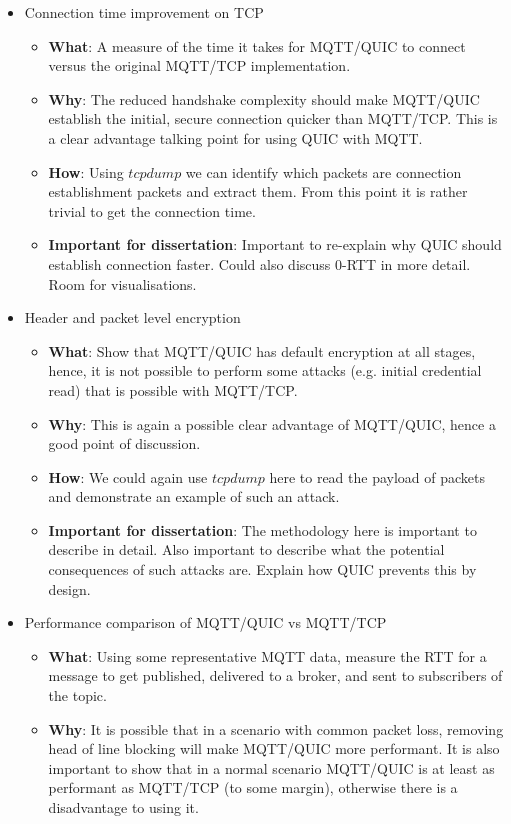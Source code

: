 \documentclass[a4paper,11pt]{article}
\begin{document}
\begin{itemize}
    \item Connection time improvement on TCP
    \begin{itemize}
        \item \textbf{What}: A measure of the time it takes for MQTT/QUIC to connect versus the original MQTT/TCP implementation.
        \item \textbf{Why}: The reduced handshake complexity should make MQTT/QUIC establish the initial, secure connection quicker than MQTT/TCP. This is a clear advantage talking point for using QUIC with MQTT.
        \item \textbf{How}: Using $tcpdump$ we can identify which packets are connection establishment packets and extract them. From this point it is rather trivial to get the connection time.
        \item \textbf{Important for dissertation}: Important to re-explain why QUIC should establish connection faster. Could also discuss 0-RTT in more detail. Room for visualisations.
    \end{itemize}
    \item Header and packet level encryption
    \begin{itemize}
        \item \textbf{What}: Show that MQTT/QUIC has default encryption at all stages, hence, it is not possible to perform some attacks (e.g. initial credential read) that is possible with MQTT/TCP.
        \item \textbf{Why}: This is again a possible clear advantage of MQTT/QUIC, hence a good point of discussion.
        \item \textbf{How}: We could again use $tcpdump$ here to read the payload of packets and demonstrate an example of such an attack.
        \item \textbf{Important for dissertation}: The methodology here is important to describe in detail. Also important to describe what the potential consequences of such attacks are. Explain how QUIC prevents this by design.
    \end{itemize}
    \item Performance comparison of MQTT/QUIC vs MQTT/TCP
    \begin{itemize}
        \item \textbf{What}: Using some representative MQTT data, measure the RTT for a message to get published, delivered to a broker, and sent to subscribers of the topic.
        \item \textbf{Why}: It is possible that in a scenario with common packet loss, removing head of line blocking will make MQTT/QUIC more performant. It is also important to show that in a normal scenario MQTT/QUIC is at least as performant as MQTT/TCP (to some margin), otherwise there is a disadvantage to using it.

\end{itemize}
\end{itemize}
\end{document}
